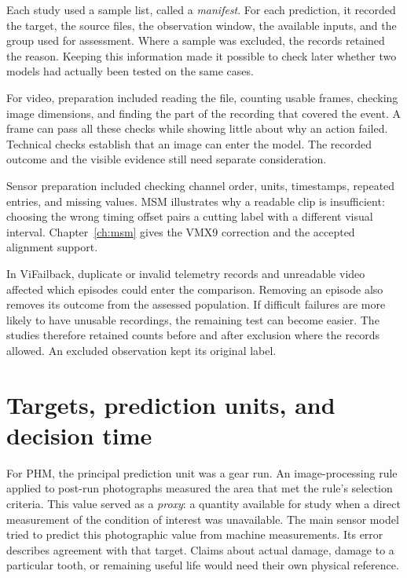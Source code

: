 Each study used a sample list, called a \emph{manifest}. For each prediction, it
recorded the target, the source files, the observation window, the available inputs, and
the group used for assessment. Where a sample was excluded, the records retained the
reason. Keeping this information made it possible to check later whether two models had
actually been tested on the same cases.

For video, preparation included reading the file, counting usable frames, checking image
dimensions, and finding the part of the recording that covered the event. A frame can
pass all these checks while showing little about why an action failed. Technical checks
establish that an image can enter the model. The recorded outcome and the visible
evidence still need separate consideration.

Sensor preparation included checking channel order, units, timestamps, repeated entries,
and missing values. MSM illustrates why a readable clip is insufficient: choosing the
wrong timing offset pairs a cutting label with a different visual interval.
Chapter~\ref{ch:msm} gives the VMX9 correction and the accepted alignment support.

In ViFailback, duplicate or invalid telemetry records and unreadable video affected
which episodes could enter the comparison. Removing an episode also removes its outcome
from the assessed population. If difficult failures are more likely to have unusable
recordings, the remaining test can become easier. The studies therefore retained counts
before and after exclusion where the records allowed. An excluded observation kept its
original label.

\section{Targets, prediction units, and decision time}
\label{sec:ch4-targets}

For PHM, the principal prediction unit was a gear run. An image-processing rule applied
to post-run photographs measured the area that met the rule’s selection criteria. This
value served as a \emph{proxy}: a quantity available for study when a direct measurement
of the condition of interest was unavailable. The main sensor model tried to predict
this photographic value from machine measurements. Its error describes agreement with
that target. Claims about actual damage, damage to a particular tooth, or remaining
useful life would need their own physical reference.

